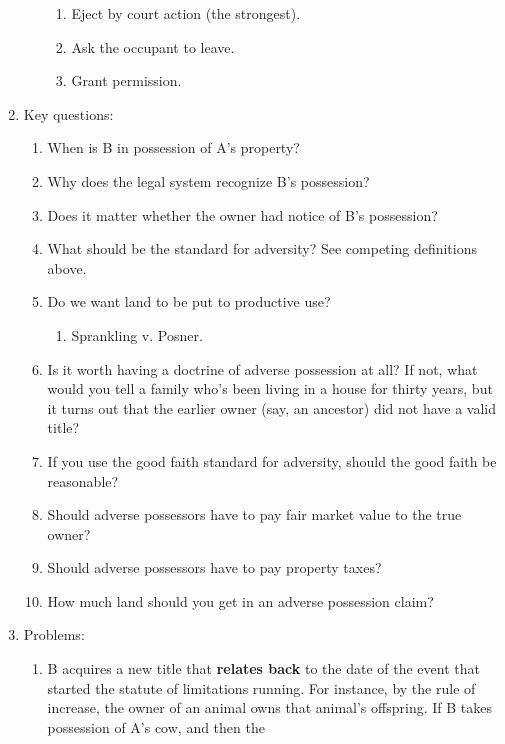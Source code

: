 \begin{enumerate}
\begin{enumerate}
\begin{enumerate}
            \item Eject by court action (the strongest).
            \item Ask the occupant to leave.
            \item Grant permission.
        \end{enumerate}
    \end{enumerate}
    \item Key questions:
    \begin{enumerate}
        \item When is B in possession of A's property?
        \item Why does the legal system recognize B's possession?
        \item Does it matter whether the owner had notice of B's possession?
        \item What should be the standard for adversity? See competing 
        definitions above.
        \item Do we want land to be put to productive use?
        \begin{enumerate}
            \item Sprankling v. Posner.
        \end{enumerate}
        \item Is it worth having a doctrine of adverse possession at all? If 
        not, what would you tell a family who's been living in a house for 
        thirty years, but it turns out that the earlier owner (say, an 
        ancestor) did not have a valid title?
        \item If you use the good faith standard for adversity, should the 
        good faith be reasonable?
        \item Should adverse possessors have to pay fair market value to the 
        true owner?
        \item Should adverse possessors have to pay property taxes?
        \item How much land should you get in an adverse possession claim?
    \end{enumerate}
    \item Problems:
    \begin{enumerate}
        \item B acquires a new title that \textbf{relates back} to the date of 
        the event that started the statute of limitations running. For 
        instance, by the rule of increase, the owner of an animal owns that 
        animal's offspring.  If B takes possession of A's cow, and then the 

\end{enumerate}
\end{enumerate}
